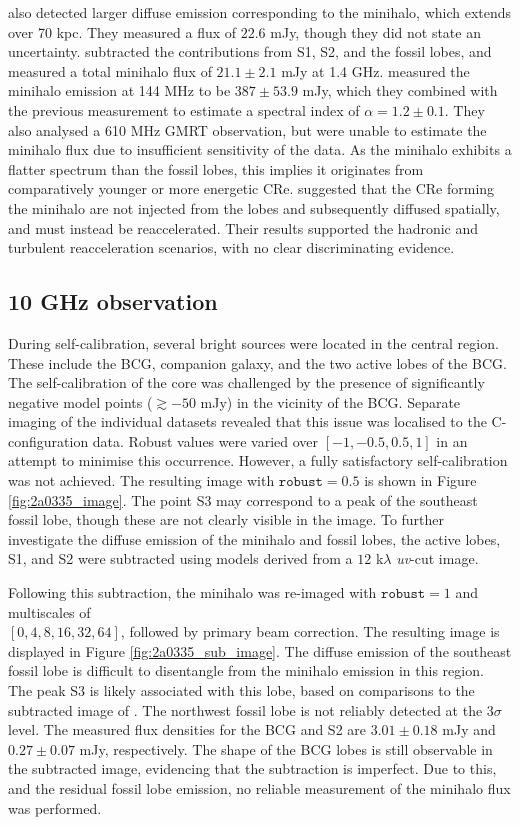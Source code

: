 \citet{Sarazin1995} also detected larger diffuse emission corresponding to the minihalo, which extends over 70 kpc. They measured a flux of $22.6$ mJy, though they did not state an uncertainty. \citet{Giacintucci2019} subtracted the contributions from S1, S2, and the fossil lobes, and measured a total minihalo flux of $21.1\pm2.1$ mJy at 1.4 GHz. \citet{Ignesti2022} measured the minihalo emission at 144 MHz to be $387\pm53.9$ mJy, which they combined with the previous measurement to estimate a spectral index of $\alpha=1.2\pm0.1$. They also analysed a 610 MHz GMRT observation, but were unable to estimate the minihalo flux due to insufficient sensitivity of the data. As the minihalo exhibits a flatter spectrum than the fossil lobes, this implies it originates from comparatively younger or more energetic CRe. \citet{Ignesti2022} suggested that the CRe forming the minihalo are not injected from the lobes and subsequently diffused spatially, and must instead be reaccelerated. Their results supported the hadronic and turbulent reacceleration scenarios, with no clear discriminating evidence.

\subsection{10 GHz observation}
During self-calibration, several bright sources were located in the central region. These include the BCG, companion galaxy, and the two active lobes of the BCG. The self-calibration of the core was challenged by the presence of significantly negative model points ($\gtrsim-50$ mJy) in the vicinity of the BCG. Separate imaging of the individual datasets revealed that this issue was localised to the C-configuration data. Robust values were varied over $[-1, -0.5, 0.5, 1]$ in an attempt to minimise this occurrence. However, a fully satisfactory self-calibration was not achieved. The resulting image with $\texttt{robust}=0.5$ is shown in Figure \ref{fig:2a0335_image}. The point S3 may correspond to a peak of the southeast fossil lobe, though these are not clearly visible in the image. To further investigate the diffuse emission of the minihalo and fossil lobes, the active lobes, S1, and S2 were subtracted using models derived from a $12$ k$\lambda$ \textit{uv}-cut image.

Following this subtraction, the minihalo was re-imaged with $\texttt{robust}=1$ and multiscales of \\$[0, 4, 8, 16, 32, 64]$, followed by primary beam correction. The resulting image is displayed in Figure \ref{fig:2a0335_sub_image}. The diffuse emission of the southeast fossil lobe is difficult to disentangle from the minihalo emission in this region. The peak S3 is likely associated with this lobe, based on comparisons to the subtracted image of \citet{Giacintucci2019}. The northwest fossil lobe is not reliably detected at the $3\sigma$ level. The measured flux densities for the BCG and S2 are $3.01\pm0.18$ mJy and $0.27\pm0.07$ mJy, respectively. The shape of the BCG lobes is still observable in the subtracted image, evidencing that the subtraction is imperfect. Due to this, and the residual fossil lobe emission, no reliable measurement of the minihalo flux was performed. 

